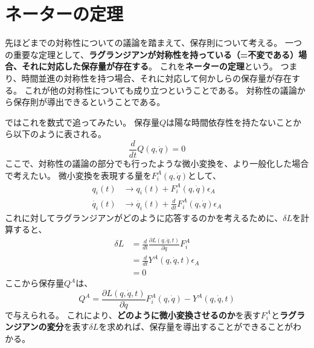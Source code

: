 \documentclass[a4paper]{jsreport}
\begin{document}
        \section{ネーターの定理}
            先ほどまでの対称性についての議論を踏まえて、保存則について考える。
            一つの重要な定理として、\textbf{ラグランジアンが対称性を持っている（=不変である）場合、それに対応した保存量が存在する}。
            これを\textbf{ネーターの定理}という。
            つまり、時間並進の対称性を持つ場合、それに対応して何かしらの保存量が存在する。
            これが他の対称性についても成り立つということである。
            対称性の議論から保存則が導出できるということである。\par
            ではこれを数式で追ってみたい。
            保存量$Q$は陽な時間依存性を持たないことから以下のように表される。
            \begin{equation}
                \frac{d}{dt}Q(q, \dot{q}) = 0
            \end{equation}
            ここで、対称性の議論の部分でも行ったような微小変換を、より一般化した場合で考えたい。
            微小変換を表現する量を$F_i^A(q, \dot{q})$として、
            \begin{align}
                q_i(t) &\to q_i(t) + F_i^A(q, \dot{q}) \epsilon_A \\
                \dot{q_i}(t) &\to \dot{q_i}(t) + \frac{d}{dt} F_i^A(q, \dot{q}) \epsilon_A
            \end{align}
            これに対してラグランジアンがどのように応答するのかを考えるために、$\delta L$を計算すると、
            \begin{align}
                \delta L &= \frac{d}{dt} \frac{\partial L(q, \dot{q}, t)}{\partial \dot{q}} F_i^A \\
                &= \frac{d}{dt} Y^A(q, \dot{q}, t) \epsilon_A \\
                &= 0
            \end{align}
            ここから保存量$Q^A$は、
            \begin{equation} \label{eq:3a}
                Q^A = \frac{\partial L(q, \dot{q}, t)}{\partial \dot{q}} F_i^A(q, \dot{q}) - Y^A(q, \dot{q}, t)
            \end{equation}
            で与えられる。
            これにより、\textbf{どのように微小変換させるのか}を表す$F_i^A$と\textbf{ラグランジアンの変分}を表す$\delta L$を求めれば、保存量を導出することができることがわかる。
\end{document}
